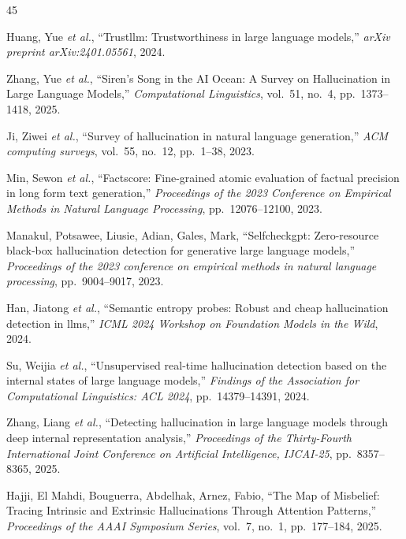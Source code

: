 \documentclass[journal]{IEEEtran}
\begin{document}

\begin{thebibliography}{45}

Huang, Yue \emph{et al.}, ``Trustllm: Trustworthiness in large language models,'' \emph{arXiv preprint arXiv:2401.05561}, 2024.

Zhang, Yue \emph{et al.}, ``Siren's Song in the AI Ocean: A Survey on Hallucination in Large Language Models,'' \emph{Computational Linguistics}, vol.~51, no.~4, pp.~1373--1418, 2025.

Ji, Ziwei \emph{et al.}, ``Survey of hallucination in natural language generation,'' \emph{ACM computing surveys}, vol.~55, no.~12, pp.~1--38, 2023.

Min, Sewon \emph{et al.}, ``Factscore: Fine-grained atomic evaluation of factual precision in long form text generation,'' \emph{Proceedings of the 2023 Conference on Empirical Methods in Natural Language Processing}, pp.~12076--12100, 2023.

Manakul, Potsawee, Liusie, Adian, Gales, Mark, ``Selfcheckgpt: Zero-resource black-box hallucination detection for generative large language models,'' \emph{Proceedings of the 2023 conference on empirical methods in natural language processing}, pp.~9004--9017, 2023.

Han, Jiatong \emph{et al.}, ``Semantic entropy probes: Robust and cheap hallucination detection in llms,'' \emph{ICML 2024 Workshop on Foundation Models in the Wild}, 2024.

Su, Weijia \emph{et al.}, ``Unsupervised real-time hallucination detection based on the internal states of large language models,'' \emph{Findings of the Association for Computational Linguistics: ACL 2024}, pp.~14379--14391, 2024.

Zhang, Liang \emph{et al.}, ``Detecting hallucination in large language models through deep internal representation analysis,'' \emph{Proceedings of the Thirty-Fourth International Joint Conference on Artificial Intelligence, IJCAI-25}, pp.~8357--8365, 2025.

Hajji, El Mahdi, Bouguerra, Abdelhak, Arnez, Fabio, ``The Map of Misbelief: Tracing Intrinsic and Extrinsic Hallucinations Through Attention Patterns,'' \emph{Proceedings of the AAAI Symposium Series}, vol.~7, no.~1, pp.~177--184, 2025.


\end{thebibliography}
\end{document}
